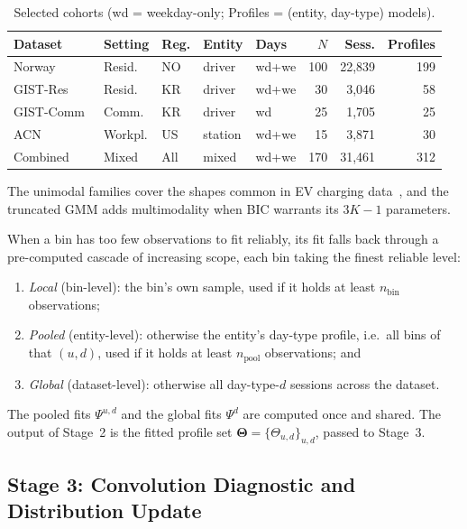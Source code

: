 \documentclass[journal]{IEEEtran}
\begin{document}
\begin{table}[t]
\centering
\caption{Selected cohorts (wd = weekday-only; Profiles = (entity, day-type) models).}
\label{tab:datasets}
\setlength{\tabcolsep}{3pt}
\footnotesize
\begin{tabular}{lllllrrr}
\toprule
\textbf{Dataset} & \textbf{Setting} & \textbf{Reg.} & \textbf{Entity} & \textbf{Days} & \textbf{$N$} & \textbf{Sess.} & \textbf{Profiles} \\
\midrule
Norway~\cite{sorensen2024}   & Resid. & NO & driver  & wd+we & 100 & 22{,}839 & 199 \\
GIST-Res~\cite{baek2024dataset}  & Resid. & KR & driver  & wd+we &  30 &  3{,}046 &  58 \\
GIST-Comm~\cite{baek2024dataset} & Comm.  & KR & driver  & wd    &  25 &  1{,}705 &  25 \\
ACN~\cite{lee2019acndata}        & Workpl.& US & station & wd+we &  15 &  3{,}871 &  30 \\
\midrule
Combined                     & Mixed  & All & mixed & wd+we & 170 & 31{,}461 & 312 \\
\bottomrule
\end{tabular}
\end{table}


The unimodal families cover the shapes common in EV charging data~\cite{flammini2019}, and the truncated GMM adds multimodality when BIC warrants its $3K - 1$ parameters.

When a bin has too few observations to fit reliably, its fit falls back through a pre-computed cascade of increasing scope, each bin taking the finest reliable level:
\begin{enumerate}
    \item \emph{Local} (bin-level): the bin's own sample, used if it holds at least $n_{\mathrm{bin}}$ observations;
    \item \emph{Pooled} (entity-level): otherwise the entity's day-type profile, i.e.\ all bins of that $(u,d)$, used if it holds at least $n_{\mathrm{pool}}$ observations; and
    \item \emph{Global} (dataset-level): otherwise all day-type-$d$ sessions across the dataset.
\end{enumerate}
The pooled fits $\Psi^{u,d}$ and the global fits $\Psi^{d}$ are computed once and shared. The output of Stage~2 is the fitted profile set $\boldsymbol{\Theta} = \{\Theta_{u,d}\}_{u,d}$, passed to Stage~3.

\subsection{Stage 3: Convolution Diagnostic and Distribution Update}
\label{subsec:stage3}
\end{document}
